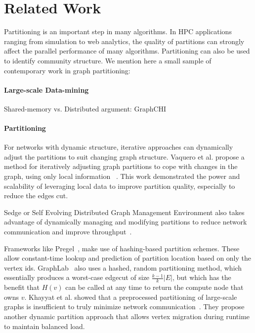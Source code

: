 \section{Related Work} \label{sec:rel}
Partitioning is an important step in many algorithms. In HPC applications ranging from simulation to web analytics, the quality of partitions can strongly affect the parallel performance of many algorithms. Partitioning can also be used to identify community structure. We mention here a small sample of contemporary work in graph partitioning:

\paragraph{Large-scale Data-mining}
Shared-memory vs. Distributed argument: GraphCHI~\cite{graphchi}

\paragraph{Partitioning}

For networks with dynamic structure, iterative approaches can dynamically adjust the partitions to suit changing graph structure.
Vaquero et al. propose a method for iteratively adjusting graph partitions to cope with changes in the graph, using only local information ~\cite{Vaquero:2013:APL:2523616.2525943}.
This work demonstrated the power and scalability of leveraging local data to improve partition quality, especially to reduce the edges cut.

Sedge or Self Evolving Distributed Graph Management Environment also takes advantage of dynamically managing and modifying partitions to reduce network communication and improve throughput~\cite{Yangpart}.

Frameworks like Pregel~\cite{Malpregel}, make use of hashing-based partition schemes.
These allow constant-time lookup and prediction of partition location based on only the vertex ids.
GraphLab~\cite{Low:2012:DGF:2212351.2212354} also uses a hashed, random partitioning method, which essentially produces a worst-case edgecut of size $\frac{k-1}{k}|E|$, but which has the benefit that $H(v)$ can be called at any time to return the compute node that owns $v$.  
Khayyat et al. showed that a preprocessed partitioning of large-scale graphs is insufficient to truly minimize network communication~\cite{khayyatmizan}.
They propose another dynamic partition approach that allows vertex migration during runtime to maintain balanced load.

